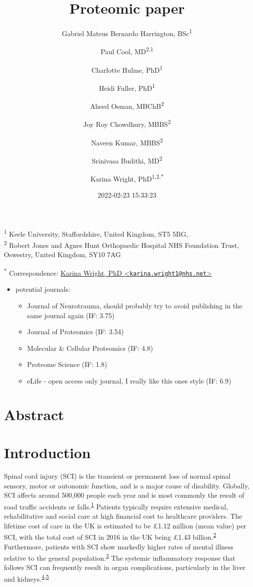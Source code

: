 \documentclass[
]{article}
\title{Proteomic paper}
\author{Gabriel Mateus Bernardo Harrington, BSc\textsuperscript{1} \and Paul Cool, MD\textsuperscript{2,1} \and Charlotte Hulme, PhD\textsuperscript{1} \and Heidi Fuller, PhD\textsuperscript{1} \and Aheed Osman, MBChB\textsuperscript{2} \and Joy Roy Chowdhury, MBBS\textsuperscript{2} \and Naveen Kumar, MBBS\textsuperscript{2} \and Srinivasa Budithi, MD\textsuperscript{2} \and Karina Wright, PhD\textsuperscript{1,2,*}}
\date{2022-02-23 15:33:23}
\providecommand{\tightlist}{%
  \setlength{\itemsep}{0pt}\setlength{\parskip}{0pt}}
\begin{document}
\maketitle

\textsuperscript{1} Keele University, Staffordshire, United Kingdom, ST5 5BG,\\
\textsuperscript{2} Robert Jones and Agnes Hunt Orthopaedic Hospital NHS Foundation Trust, Oswestry, United Kingdom, SY10 7AG

\textsuperscript{*} Correspondence: \href{mailto:karina.wright1@nhs.net}{Karina Wright, PhD \textless{}\href{mailto:karina.wright1@nhs.net}{\nolinkurl{karina.wright1@nhs.net}}\textgreater{}}

\begin{itemize}
\tightlist
\item
  potential journals:

  \begin{itemize}
  \tightlist
  \item
    Journal of Neurotrauma, should probably try to avoid publishing in the same journal again (IF: 3.75)
  \item
    Journal of Proteomics (IF: 3.54)
  \item
    Molecular \& Cellular Proteomics (IF: 4.8)
  \item
    Proteome Science (IF: 1.8)
  \item
    eLife - open access only journal, I really like this ones style (IF: 6.9)
  \end{itemize}
\end{itemize}

\hypertarget{abstract}{%
\section{Abstract}\label{abstract}}

\hypertarget{introduction}{%
\section{Introduction}\label{introduction}}

Spinal cord injury (SCI) is the transient or permanent loss of normal spinal sensory, motor or autonomic function, and is a major cause of disability.
Globally, SCI affects around 500,000 people each year and is most commonly the result of road traffic accidents or falls.\textsuperscript{\protect\hyperlink{ref-crozier-shaw_management_2020}{1}}
Patients typically require extensive medical, rehabilitative and social care at high financial cost to healthcare providers.
The lifetime cost of care in the UK is estimated to be £1.12 million (mean value) per SCI, with the total cost of SCI in 2016 in the UK being £1.43 billion.\textsuperscript{\protect\hyperlink{ref-mcdaid_understanding_2019}{2}}
Furthermore, patients with SCI show markedly higher rates of mental illness relative to the general population.\textsuperscript{\protect\hyperlink{ref-furlan_health_2017}{3}}
The systemic inflammatory response that follows SCI can frequently result in organ complications, particularly in the liver and kidneys.\textsuperscript{\protect\hyperlink{ref-gris_systemic_2008}{4},\protect\hyperlink{ref-sun_multiple_2016}{5}}
\end{document}
